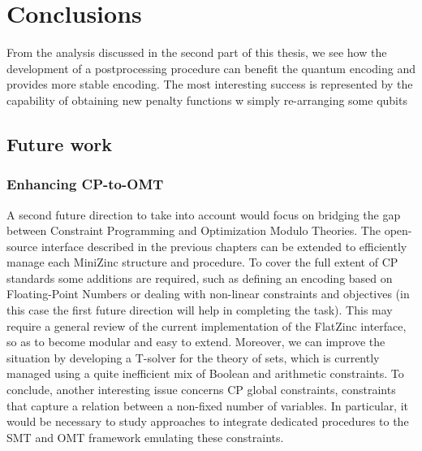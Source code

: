 \chapter{Conclusions}
\label{cha:conclusioni}

From the analysis discussed in the second part of this thesis, we see how the development of a postprocessing procedure can benefit the quantum encoding and provides more stable encoding. The most interesting success is represented by the capability of obtaining new penalty functions w simply re-arranging some qubits

\section{Future work}

\subsection{Enhancing CP-to-OMT}

A second future direction to take into account would focus on bridging the gap between Constraint Programming and Optimization Modulo Theories. The open-source interface described in the previous chapters can be extended to efficiently manage each MiniZinc structure and procedure. To cover the full extent of CP standards some additions are required, such as defining an encoding based on Floating-Point Numbers or dealing with non-linear constraints and objectives (in this case the first future direction will help in completing the task). This may require a general review of the current implementation of the FlatZinc interface, so as to become modular and easy to extend.
Moreover, we can improve the situation by developing a T-solver for the theory of sets, which is currently managed using a quite inefficient mix of Boolean and arithmetic constraints. 
To conclude, another interesting issue concerns CP global constraints, constraints that capture a relation between a non-fixed number of variables. In particular, it would be necessary to study approaches to integrate dedicated procedures to the SMT and OMT framework emulating these constraints. \\
 



